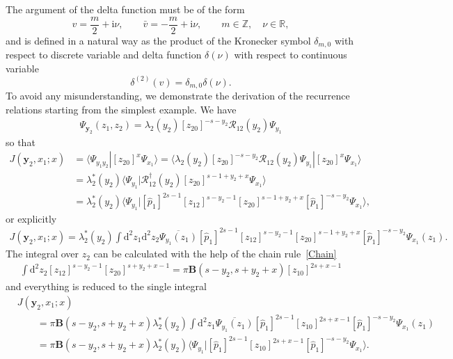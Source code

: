 \documentclass[pdftex]{sigma}
\renewcommand{\imath}{\mathrm{i}}
\numberwithin{equation}{section}
\begin{document}
The argument of the delta function  must be of the form
\begin{equation*}
	v = \frac{m}{2}+\imath\nu , \qquad \bar{v} = -\frac{m}{2}+\imath\nu ,
	\qquad m\in\mathbb{Z}, \quad \nu\in\mathbb{R} ,
\end{equation*}
and  is defined in a natural way as the product of the Kronecker symbol
$\delta_{m,0}$ with respect to discrete variable and delta function
$\delta(\nu)$ with respect to continuous variable
\begin{equation} \label{delta_sum}
	\delta^{(2)}(v) = \delta_{m,0} \delta(\nu) .
\end{equation}
To avoid any misunderstanding, we demonstrate the derivation of the recurrence
relations starting from the simplest example. We have
\begin{align*}
\Psi_{\bm{y}_2}(z_1,z_2) =
\lambda_2(y_2) [z_{20}]^{-s-y_2} \mathcal{R}_{12}(y_2) \Psi_{y_1}
\end{align*}
so that
\begin{align*}
J(\bm{y}_2,x_{1};x) & =
\langle \Psi_{y_1 y_2}|[z_{20}]^{x} \Psi_{x_{1}} \rangle =
\langle \lambda_2(y_2) [z_{20}]^{-s-y_2} \mathcal{R}_{12}(y_2) \Psi_{y_1}|[z_{20}]^{x} \Psi_{x_{1}} \rangle \\
& =
\lambda_2^\ast(y_2) \bigl\langle \Psi_{y_1}|
\mathcal{R}^{\dagger}_{12}(y_2) [z_{20}]^{s-1+y_2+x} \Psi_{x_{1}} \bigr\rangle \\
& =
\lambda_2^\ast(y_2)
\bigl\langle \Psi_{y_1}|
[\hat{p}_1]^{2s-1} [z_{12}]^{s-y_2-1} [z_{20}]^{s-1+y_2+x}
[\hat{p}_1]^{-s-y_2}
\Psi_{x_{1}} \bigr\rangle ,
\end{align*}
or explicitly
\begin{gather*}
J(\bm{y}_2,x_{1};x)
=
\lambda_2^\ast(y_2)
\int
\mathrm{d}^{2} z_1
\mathrm{d}^{2} z_2
\overline{\Psi_{y_1}(z_1)}
[\hat{p}_1]^{2s-1} [z_{12}]^{s-y_2-1} [z_{20}]^{s-1+y_2+x}
[\hat{p}_1]^{-s-y_2}
\Psi_{x_{1}}(z_1) .
\end{gather*}
The integral over $z_2$ can be calculated with the help of the
chain rule~\eqref{Chain}
\begin{align*}
\int \mathrm{d}^2 z_2 [z_{12}]^{s-y_2-1} [z_{20}]^{s+y_2+x-1} =
\pi \mathbf{B}(s-y_2,s+y_2+x) [z_{10}]^{2s+x-1}
\end{align*}
and everything is reduced to the single integral
\begin{align*}
&
J(\bm{y}_2,x_{1};x) \\
&\qquad =
\pi \mathbf{B}(s-y_2,s+y_2+x) \lambda_2^\ast(y_2)
\int
\mathrm{d}^{2} z_1
\overline{\Psi_{y_1}(z_1)}
[\hat{p}_1]^{2s-1} [z_{10}]^{2s+x-1}
[\hat{p}_1]^{-s-y_2}
\Psi_{x_{1}}(z_1) \\
&\qquad =
\pi \mathbf{B}(s-y_2,s+y_2+x) \lambda_2^\ast(y_2)
\bigl\langle \Psi_{y_1}|[\hat{p}_1]^{2s-1} [z_{10}]^{2s+x-1}
[\hat{p}_1]^{-s-y_2}
\Psi_{x_{1}}\bigr\rangle .
\end{align*}
\end{document}
